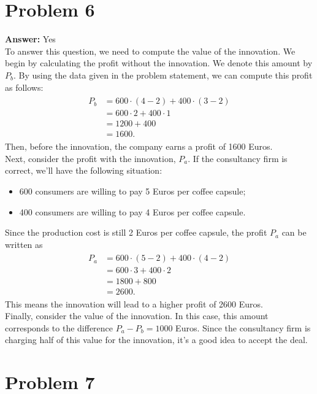 \documentclass[11pt]{article}
\begin{document}
\section*{Problem 6}
\label{sec:orgf49c7f5}

\textbf{Answer:} Yes\\

To answer this question, we need to compute the value of the innovation. We
begin by calculating the profit without the innovation. We denote this
amount by \(P_b\). By using the data given in the problem statement, we
can compute this profit as follows:
\begin{align*}
  \begin{split}
    P_b&=600\cdot(4-2)+400\cdot(3-2)\\
    &=600\cdot 2+400\cdot 1\\
    &=1200+400\\
    &=1600.
  \end{split}
\end{align*}
Then, before the innovation, the company earns a profit of 1600 Euros.\\
Next, consider the profit with the innovation, \(P_a\). If the
consultancy firm is correct, we'll have the following situation:
\begin{itemize}
\item 600 consumers are willing to pay 5 Euros per coffee capsule;
\item 400 consumers are willing to pay 4 Euros per coffee capsule.
\end{itemize}
Since the production cost is still 2 Euros per coffee capsule, the profit
\(P_a\) can be written as
\begin{align*}
  \begin{split}
    P_a&=600\cdot(5-2)+400\cdot(4-2)\\
    &=600\cdot 3+400\cdot 2\\
    &=1800+800\\
    &=2600.
  \end{split}
\end{align*}
This means the innovation will lead to a higher profit of 2600 Euros.\\
Finally, consider the value of the innovation. In this case, this amount
corresponds to the difference \(P_a-P_b=1000\) Euros. Since the
consultancy firm is charging half of this value for the innovation, it's a
good idea to accept the deal.
\section*{Problem 7}
\label{sec:org21b4185}
\end{document}
